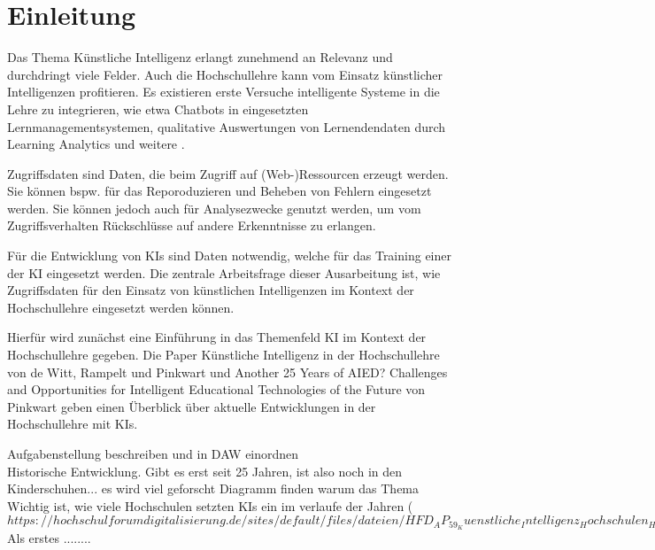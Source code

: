 \chapter{Einleitung}
Das Thema Künstliche Intelligenz erlangt zunehmend an Relevanz und durchdringt viele Felder. Auch die Hochschullehre kann vom Einsatz künstlicher Intelligenzen profitieren. Es existieren erste Versuche intelligente Systeme in die Lehre zu integrieren, wie etwa Chatbots in eingesetzten Lernmanagementsystemen, qualitative Auswertungen von Lernendendaten durch Learning Analytics und weitere \cite*[S. 18, S. 14ff.]{Witt.2020}.

Zugriffsdaten sind Daten, die beim Zugriff auf (Web-)Ressourcen erzeugt werden. Sie können bspw. für das Reporoduzieren und Beheben von Fehlern eingesetzt werden. Sie können jedoch auch für Analysezwecke genutzt werden, um vom Zugriffsverhalten Rückschlüsse auf andere Erkenntnisse zu erlangen.

Für die Entwicklung von KIs sind Daten notwendig, welche für das Training einer der KI eingesetzt werden. Die zentrale Arbeitsfrage dieser Ausarbeitung ist, wie Zugriffsdaten für den Einsatz von künstlichen Intelligenzen im Kontext der Hochschullehre eingesetzt werden können.

Hierfür wird zunächst eine Einführung in das Themenfeld KI im Kontext der Hochschullehre gegeben. Die Paper \glqq Künstliche Intelligenz in der Hochschullehre\grqq{} von de Witt, Rampelt und Pinkwart und \glqq Another 25 Years of AIED? Challenges and Opportunities for Intelligent Educational Technologies of the Future\grqq{} von Pinkwart geben einen Überblick über aktuelle Entwicklungen in der Hochschullehre mit KIs.

Aufgabenstellung beschreiben und in DAW einordnen
\\
\noindent
Historische Entwicklung. Gibt es erst seit 25 Jahren, ist also noch in den Kinderschuhen... es wird viel geforscht
Diagramm finden warum das Thema Wichtig ist, wie viele Hochschulen setzten KIs ein im verlaufe der Jahren ($https://hochschulforumdigitalisierung.de/sites/default/files/dateien/HFD_AP_59_Kuenstliche_Intelligenz_Hochschulen_HIS-HE.pdf Seite 9)$
\\
\noindent
Als erstes ........